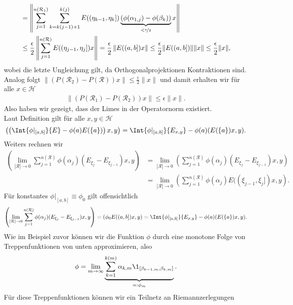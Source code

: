 \begin{solution}
\begin{align*}
  &= \left\|
  \sum_{j=1}^{n(\mathcal{R}_1)}\sum_{k =k(j-1)+1}^{k(j)}
  E((\eta_{k-1},\eta_{k}])
  \underbrace{(\phi(\alpha_{1,j}) - \phi(\beta_k))}_{<\nicefrac{\epsilon}{2}}x\right\| \\
  &\leq \frac{\epsilon}{2}\left\|
  \sum_{j=1}^{n(\mathcal{R})}
  E((\eta_{j-1},\eta_{j}])x\right\|
  = \frac{\epsilon}{2}\left\|E((a,b])x\right\| \leq \frac{\epsilon}{2}\|E((a,b])\|\|x\|
  \leq \frac{\epsilon}{2}\|x\|,
\end{align*}
wobei die letzte Ungleichung gilt, da Orthogonalprojektionen Kontraktionen sind. \\
Analog folgt $\|(P(\mathcal{R}_2) - P(\mathcal{R}))x\| \leq \frac{\epsilon}{2}\|x\|$
und damit erhalten wir für alle $x \in \mathcal{H}$
\begin{align*}
  \|(P(\mathcal{R}_1) - P(\mathcal{R}_2))x\| \leq \epsilon\|x\|.
\end{align*}
Also haben wir gezeigt, dass der Limes in der Operatornorm existiert. \\
Laut Definition gilt für alle $x,y \in \mathcal{H}$
\begin{align*}
  \left(\left(\Int{\phi|_{[a,b]}}{E} - \phi(a) E(\{a\})\right)x,y\right) =
  \Int{\phi|_{[a,b]}}{E_{x,y}} - \phi(a)(E(\{a\})x,y).
\end{align*}
Weiters rechnen wir
\begin{align*}
  \left(\lim_{|\mathcal{R}| \to 0}\sum_{j=1}^{n(\mathcal{R})}
  \phi(\alpha_j)(E_{\xi_j} - E_{\xi_{j-1}})x,y\right) &=
  \lim_{|\mathcal{R}| \to 0}
  \left(\sum_{j=1}^{n(\mathcal{R})}\phi(\alpha_j)(E_{\xi_j} - E_{\xi_{j-1}})x,y\right) \\
  &= \lim_{|\mathcal{R}| \to 0}
  \left(\sum_{j=1}^{n(\mathcal{R})}\phi(\alpha_j)E((\xi_{j-1},\xi_j])x,y\right).
\end{align*}
Für konstantes $\phi|_{[a,b]} \equiv \phi_0$ gilt offensichtlich
\begin{align*}
  \left(\lim_{|\mathcal{R}| \to 0}\sum_{j=1}^{n(\mathcal{R})}
  \phi(\alpha_j)(E_{\xi_j} - E_{\xi_{j-1}})x,y\right) =
  (\phi_0E((a,b])x,y) = \Int{\phi|_{[a,b]}}{E_{x,y}} - \phi(a)(E(\{a\})x,y).
\end{align*}
Wie im Beispiel zuvor können wir die Funktion $\phi$ durch eine monotone Folge
von Treppenfunktionen von unten approximieren, also
\begin{align*}
  \phi = \lim_{m \to \infty}\underbrace{\sum_{k=1}^{k(m)}\alpha_{k,m}
  \1_{[\beta_{k-1,m},\beta_{k,m}]}}_{=: \phi_m}.
\end{align*}
Für diese Treppenfunktionen können wir ein Teilnetz an Riemannzerlegungen

\end{solution}

